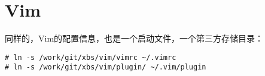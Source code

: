\section{Vim}
同样的，Vim的配置信息，也是一个启动文件，一个第三方存储目录：
\begin{lstlisting}[numbers=none]
# ln -s /work/git/xbs/vim/vimrc ~/.vimrc
# ln -s /work/git/xbs/vim/plugin/ ~/.vim/plugin
\end{lstlisting}


